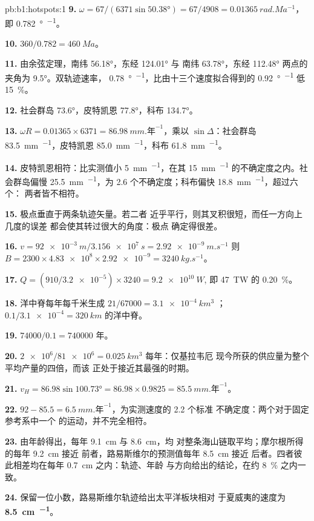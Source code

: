 \begin{solution}{pb:b1:hotspots:1}
\textbf{9.} $\omega = 67/(6371\sin\ang{50.38}) = 67/4908 =
\qty{0.01365}{rad.Ma^{-1}}$，即 \qty{0.782}{\degree\per\Ma}。

\textbf{10.} $360/0.782 = \qty{460}{Ma}$。

\textbf{11.} 由余弦定理，南纬 \ang{56.18}，东经 \ang{124.01} 与
南纬 \ang{63.78}，东经 \ang{112.48} 两点的夹角为 \ang{9.5}。双轨迹速率，
\qty{0.78}{\degree\per\Ma}，比由十三个速度拟合得到的
\qty{0.92}{\degree\per\Ma} 低 \qty{15}{\percent}。

\textbf{12.} 社会群岛 \ang{73.6}，皮特凯恩 \ang{77.8}，科布 \ang{134.7}。

\textbf{13.} $\omega R = 0.01365\times6371 = \qty{86.98}{mm.\text{年}^{-1}}$，乘以
$\sin\Delta$：社会群岛 \qty{83.5}{mm.^{-1}}，皮特凯恩
\qty{85.0}{mm.^{-1}}，科布 \qty{61.8}{mm.^{-1}}。

\textbf{14.} 皮特凯恩相符：比实测值小 \qty{5}{mm.^{-1}}，在其
\qty{15}{mm.^{-1}} 的不确定度之内。社会群岛偏慢 \qty{25.5}{mm.^{-1}}，为 2.6
个不确定度；科布偏快 \qty{18.8}{mm.^{-1}}，超过六个：
两者皆不相符。

\textbf{15.} 极点垂直于两条轨迹矢量。若二者
近乎平行，则其叉积很短，而任一方向上几度的误差
都会使其转过很大的角度：极点
确定得很差。

\textbf{16.} $v = \qty{92e-3}{m}/\qty{3.156e7}{s} = \qty{2.92e-9}{m.s^{-1}}$
则 $B = 2300\times\num{4.83e8}\times\num{2.92e-9} = \qty{3240}{kg.s^{-1}}$。

\textbf{17.} $Q = (910/\num{3.2e-5})\times3240 = \qty{9.2e10}{W}$,
即 \qty{47}{TW} 的 \qty{0.20}{\percent}。

\textbf{18.} 洋中脊每年每千米生成 $21/67000 = \qty{3.1e-4}{km^3}$
；$0.1/\num{3.1e-4} = \qty{320}{km}$ 的洋中脊。

\textbf{19.} $74000/0.1 = \num{740000}$ 年。

\textbf{20.} $\num{2e6}/\num{81e6} = \qty{0.025}{km^3}$ 每年：仅基拉韦厄
现今所获的供应量为整个平均产量的四倍，而该
正处于接近其最强的时期。

\textbf{21.} $v_H = 86.98\sin\ang{100.73} = 86.98\times0.9825 =
\qty{85.5}{mm.\text{年}^{-1}}$。

\textbf{22.} $92 - 85.5 = \qty{6.5}{mm.\text{年}^{-1}}$，为实测速度的 2.2 个标准
不确定度：两个对于固定参考系中一个
的运动，并不完全相符。

\textbf{23.} 由年龄得出，每年 \qty{9.1}{cm} 与 \qty{8.6}{cm}，均
对整条海山链取平均；摩尔根所得的每年 \qty{9.2}{cm} 接近
前者，路易斯维尔的预测值每年 \qty{8.5}{cm} 接近
后者。四者彼此相差均在每年 \qty{0.7}{cm} 之内：轨迹、年龄
与方向给出的结论，在约 \qty{8}{\percent} 之内一致。

\textbf{24.} 保留一位小数，路易斯维尔轨迹给出太平洋板块相对
于夏威夷的速度为
\textbf{\qty[text-series-to-math=true]{8.5}{cm.^{-1}}}。
\end{solution}
